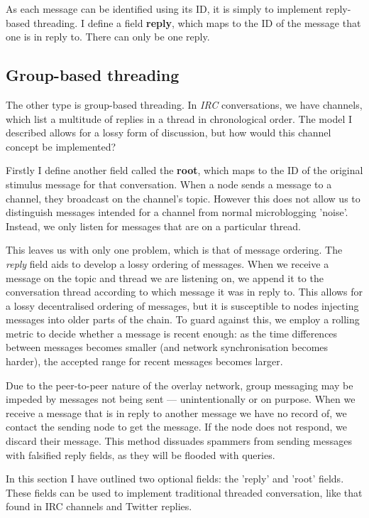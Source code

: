 \documentclass[10pt,a4paper,onecolumn]{article}
\begin{document}
As each message can be identified using its ID, it is simply to implement reply-based threading. I define a field \textbf{reply}, which maps to the ID of the message that one is in reply to. There can only be one reply. 

\subsection*{Group-based threading}
The other type is group-based threading. In \textit{IRC} conversations, we have channels, which list a multitude of replies in a thread in chronological order. The model I described allows for a lossy form of discussion, but how would this channel concept be implemented? 

Firstly I define another field called the \textbf{root}, which maps to the ID of the original stimulus message for that conversation. When a node sends a message to a channel, they broadcast on the channel's topic. However this does not allow us to distinguish messages intended for a channel from normal microblogging 'noise'. Instead, we only listen for messages that are on a particular thread. 

This leaves us with only one problem, which is that of message ordering. The \emph{reply} field aids to develop a lossy ordering of messages. When we receive a message on the topic and thread we are listening on, we append it to the conversation thread according to which message it was in reply to. This allows for a lossy decentralised ordering of messages, but it is susceptible to nodes injecting messages into older parts of the chain. To guard against this, we employ a rolling metric to decide whether a message is recent enough: as the time differences between messages becomes smaller (and network synchronisation becomes harder), the accepted range for recent messages becomes larger. 

Due to the peer-to-peer nature of the overlay network, group messaging may be impeded by messages not being sent — unintentionally or on purpose. When we receive a message that is in reply to another message we have no record of, we contact the sending node to get the message. If the node does not respond, we discard their message. This method dissuades spammers from sending messages with falsified reply fields, as they will be flooded with queries. 

In this section I have outlined two optional fields: the 'reply' and 'root' fields. These fields can be used to implement traditional threaded conversation, like that found in IRC channels and Twitter replies.
\end{document}
